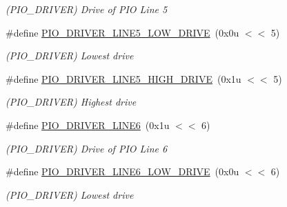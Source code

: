 \begin{DoxyCompactItemize}
\begin{DoxyCompactList}\small\item\em (P\+I\+O\+\_\+\+D\+R\+I\+V\+ER) Drive of P\+IO Line 5 \end{DoxyCompactList}\item 
\mbox{\label{group__SAME70__PIO_ga269764df2045050efd656b580b7a5338}} 
\#define \mbox{\hyperlink{group__SAME70__PIO_ga269764df2045050efd656b580b7a5338}{P\+I\+O\+\_\+\+D\+R\+I\+V\+E\+R\+\_\+\+L\+I\+N\+E5\+\_\+\+L\+O\+W\+\_\+\+D\+R\+I\+VE}}~(0x0u $<$$<$ 5)
\begin{DoxyCompactList}\small\item\em (P\+I\+O\+\_\+\+D\+R\+I\+V\+ER) Lowest drive \end{DoxyCompactList}\item 
\mbox{\label{group__SAME70__PIO_ga1057e8896c2146ad9e70c84255096065}} 
\#define \mbox{\hyperlink{group__SAME70__PIO_ga1057e8896c2146ad9e70c84255096065}{P\+I\+O\+\_\+\+D\+R\+I\+V\+E\+R\+\_\+\+L\+I\+N\+E5\+\_\+\+H\+I\+G\+H\+\_\+\+D\+R\+I\+VE}}~(0x1u $<$$<$ 5)
\begin{DoxyCompactList}\small\item\em (P\+I\+O\+\_\+\+D\+R\+I\+V\+ER) Highest drive \end{DoxyCompactList}\item 
\mbox{\label{group__SAME70__PIO_ga70e7629ab4e61d43938855116d2e76c0}} 
\#define \mbox{\hyperlink{group__SAME70__PIO_ga70e7629ab4e61d43938855116d2e76c0}{P\+I\+O\+\_\+\+D\+R\+I\+V\+E\+R\+\_\+\+L\+I\+N\+E6}}~(0x1u $<$$<$ 6)
\begin{DoxyCompactList}\small\item\em (P\+I\+O\+\_\+\+D\+R\+I\+V\+ER) Drive of P\+IO Line 6 \end{DoxyCompactList}\item 
\mbox{\label{group__SAME70__PIO_gaf1d14669e91ed56df0d527800e40f47d}} 
\#define \mbox{\hyperlink{group__SAME70__PIO_gaf1d14669e91ed56df0d527800e40f47d}{P\+I\+O\+\_\+\+D\+R\+I\+V\+E\+R\+\_\+\+L\+I\+N\+E6\+\_\+\+L\+O\+W\+\_\+\+D\+R\+I\+VE}}~(0x0u $<$$<$ 6)
\begin{DoxyCompactList}\small\item\em (P\+I\+O\+\_\+\+D\+R\+I\+V\+ER) Lowest drive \end{DoxyCompactList}\item 

\end{DoxyCompactItemize}
